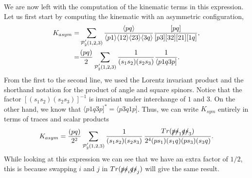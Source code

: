 We are now left with the computation of the kinematic terms in this expression. Let us first start by computing the kinematic with an asymmetric configuration,
\begin{align}
K_{asym}=&\sum_{\mathcal{P}^{'}_2(1,2,3)} \frac{\langle pq\rangle}{\langle p1\rangle \langle12\rangle \langle23\rangle \langle3q\rangle} \frac{[pq]}{[p3] [32] [21] [1q]}, \\
=& \frac{(p q)}{2} \sum_{\mathcal{P}^{'}_2(1,2,3)} \frac{1}{(s_1 s_2) (s_2  s_3)} \frac{1}{\langle p1q3p]}. \label{ksym}
\end{align}
From the first to the second line, we used the Lorentz invariant product and the shorthand notation for the product of angle and square spinors. Notice that the factor $[(s_1 s_2) (s_2 s_3)]^{-1}$ is invariant under interchange of $1$ and $3$. On the other hand, we know that $\langle p1q3p]^*=\langle p3q1p]$. Thus, we can write $K_{sym}$ entirely in terms of traces and scalar products
\begin{equation}
K_{asym}= \frac{(p q )}{2^2} \sum_{\mathcal{P}^{'}_2(1,2,3)} \frac{1}{(s_1 s_2) (s_2 s_3)} \, \frac{Tr(\slashed{p} \slashed{s}_1 \slashed{q} \slashed{s}_3)}{2^4(p s_1) (s_1 q) (p s_3) (s_3 q)}.
\end{equation}
While looking at this expression we can see that we have an extra factor of $1/2$, this is because swapping $i$ and $j$ in $Tr(\slashed{p} \slashed{s}_i \slashed{q} \slashed{s}_j)$ will give the same result. 

